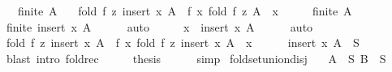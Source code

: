 \begin{isabellebody}
\ \ \ {\isachardoublequoteopen}finite\ A{\isachardoublequoteclose}\isanewline
\ \ \ {\isachardoublequoteopen}fold\ f\ z\ {\isacharparenleft}{\kern0pt}insert\ x\ A{\isacharparenright}{\kern0pt}\ {\isacharequal}{\kern0pt}\ f\ x\ {\isacharparenleft}{\kern0pt}fold\ f\ z\ {\isacharparenleft}{\kern0pt}A\ {\isacharminus}{\kern0pt}\ {\isacharbraceleft}{\kern0pt}x{\isacharbraceright}{\kern0pt}{\isacharparenright}{\kern0pt}{\isacharparenright}{\kern0pt}{\isachardoublequoteclose}\isanewline
%
\isadelimproof
%
\endisadelimproof
%
\isatagproof
{}\isamarkupfalse%
\ {\isacharminus}{\kern0pt}\isanewline
\ \ \isamarkupfalse%
\ {\isacartoucheopen}finite\ A{\isacartoucheclose}\ \isamarkupfalse%
\ {\isachardoublequoteopen}finite\ {\isacharparenleft}{\kern0pt}insert\ x\ A{\isacharparenright}{\kern0pt}{\isachardoublequoteclose}\isanewline
\ \ \ \ \isamarkupfalse%
\ auto\isanewline
\ \ \isamarkupfalse%
\ \isamarkupfalse%
\ {\isachardoublequoteopen}x\ {\isasymin}\ insert\ x\ A{\isachardoublequoteclose}\isanewline
\ \ \ \ \isamarkupfalse%
\ auto\isanewline
\ \ \isamarkupfalse%
\ \isamarkupfalse%
\ {\isachardoublequoteopen}fold\ f\ z\ {\isacharparenleft}{\kern0pt}insert\ x\ A{\isacharparenright}{\kern0pt}\ {\isacharequal}{\kern0pt}\ f\ x\ {\isacharparenleft}{\kern0pt}fold\ f\ z\ {\isacharparenleft}{\kern0pt}insert\ x\ A\ {\isacharminus}{\kern0pt}\ {\isacharbraceleft}{\kern0pt}x{\isacharbraceright}{\kern0pt}{\isacharparenright}{\kern0pt}{\isacharparenright}{\kern0pt}{\isachardoublequoteclose}\isanewline
\ \ \ \ \isamarkupfalse%
\ {\isacartoucheopen}insert\ x\ A\ {\isasymsubseteq}\ S{\isacartoucheclose}\ \isamarkupfalse%
\ {\isacharparenleft}{\kern0pt}blast\ intro{\isacharcolon}{\kern0pt}\ fold{\isacharunderscore}{\kern0pt}rec{\isacharparenright}{\kern0pt}\isanewline
\ \ \isamarkupfalse%
\ \isamarkupfalse%
\ {\isacharquery}{\kern0pt}thesis\isanewline
\ \ \ \ \isamarkupfalse%
\ simp\isanewline
{}\isamarkupfalse%
%
\endisatagproof
{\isafoldproof}%
%
\isadelimproof
\isanewline
%
\endisadelimproof
\isanewline
{}\isamarkupfalse%
\ fold{\isacharunderscore}{\kern0pt}set{\isacharunderscore}{\kern0pt}union{\isacharunderscore}{\kern0pt}disj{\isacharcolon}{\kern0pt}\isanewline
\ \ \ {\isachardoublequoteopen}A\ {\isasymsubseteq}\ S{\isachardoublequoteclose}\ {\isachardoublequoteopen}B\ {\isasymsubseteq}\ S{\isachardoublequoteclose}\isanewline

\end{isabellebody}
